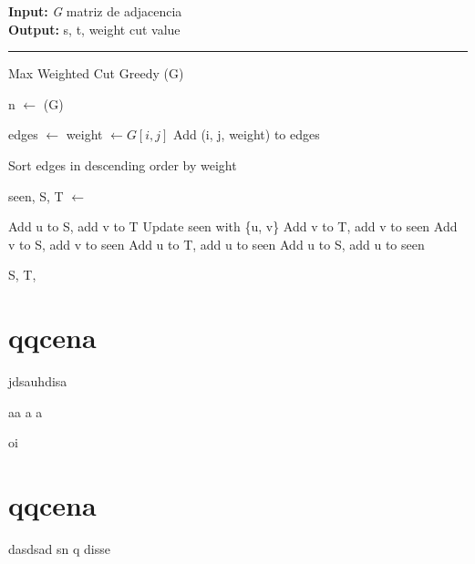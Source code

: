 \documentclass[mirror]{revdetua}
\begin{document}
\begin{algorithm}
    \raggedright
    \textbf{Input:} \textit{G} matriz de adjacencia \\
    \textbf{Output:} s, t, weight cut value \\
    \hrule 
    \caption{Max Weighted Cut Greedy (G)}
    \begin{algorithmic}[1]
    
        \State n $\gets$ (G)

        \State edges $\gets$ 
                \State weight $\gets G[i, j]$
                \State Add (i, j, weight) to edges
            \EndFor
        \EndFor

        \State Sort edges in descending order by weight

        \State seen, S, T $\gets$ 

                \State Add u to S, add v to T
                \State Update seen with \{u, v\}
                \State Add v to T, add v to seen
                \State Add v to S, add v to seen
                \State Add u to T, add u to seen
                \State Add u to S, add u to seen
            \Else
            \EndIf
        \EndFor

        \State \Return S, T, 
    
    \end{algorithmic}
\end{algorithm}

\pagebreak

\section{qqcena}

jdsauhdisa


aa a a

oi

\section{qqcena}
dasdsad sn q disse


\end{document}
